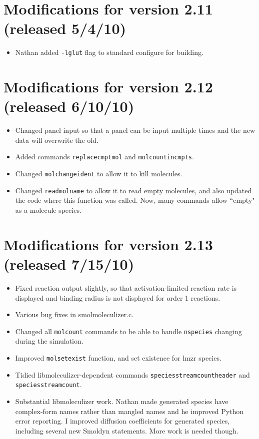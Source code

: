 \documentclass {scrbook}
\newcommand {\ttt} {\texttt}
\begin{document}
\section{Modifications for version 2.11 (released 5/4/10)}
\begin{itemize}
\item Nathan added \ttt{-lglut} flag to standard configure for building.
\end{itemize}

\section{Modifications for version 2.12 (released 6/10/10)}
\begin{itemize}
\item Changed panel input so that a panel can be input multiple times and the new data will overwrite the old.
\item Added commands \ttt{replacecmptmol} and \ttt{molcountincmpts}.
\item Changed \ttt{molchangeident} to allow it to kill molecules.
\item Changed \ttt{readmolname} to allow it to read empty molecules, and also updated the code where this function was called. Now, many commands allow ``empty" as a molecule species.
\end{itemize}

\section{Modifications for version 2.13 (released 7/15/10)}
\begin{itemize}
\item Fixed reaction output slightly, so that activation-limited reaction rate is displayed and binding radius is not displayed for order 1 reactions.
\item Various bug fixes in smolmoleculizer.c.
\item Changed all \ttt{molcount} commands to be able to handle \ttt{nspecies} changing during the simulation.
\item Improved \ttt{molsetexist} function, and set existence for lmzr species.
\item Tidied libmoleculizer-dependent commands \ttt{speciesstreamcountheader} and \ttt{speciesstreamcount}.
\item Substantial libmoleculizer work. Nathan made generated species have complex-form names rather than mangled names and he improved Python error reporting. I improved diffusion coefficients for generated species, including several new Smoldyn statements. More work is needed though.
\end{itemize}
\end{document}
